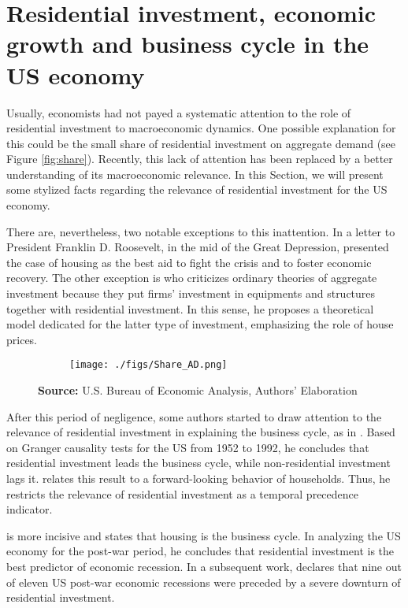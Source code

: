 \documentclass[12pt, a4paper]{article}
\begin{document}
\section{Residential investment, economic growth and business cycle in the US economy}
\label{sec:org33f19a2}
\label{sec:Stylized_Facts}
Usually, economists had not payed a systematic attention to the role of residential investment to macroeconomic dynamics.
One possible explanation for this could be the small share of residential investment on aggregate demand (see Figure \ref{fig:share}).
Recently, this lack of attention has been replaced by a better understanding of its macroeconomic relevance.
In this Section, we will present some stylized facts regarding the relevance of residential investment for the US economy.

There are, nevertheless, two notable exceptions to this inattention.
In a letter to President Franklin D. Roosevelt, in the mid of the Great Depression, \textcite[p.~436]{keynes_collected_1978} presented the case of housing as the best aid to fight the crisis and to foster economic recovery.
The other exception is \textcite{duesenberry_investment_1958} who criticizes ordinary theories of aggregate investment because they put firms’ investment in equipments and structures together with residential investment.
In this sense, he proposes a theoretical model dedicated for the latter type of investment, emphasizing the role of house prices.


\begin{figure}[H]
    \centering
	\caption{Expenditures share on aggregate demand}
	\label{fig:share}
\begin{figure}[htb]
    \texttt{[image: ./figs/Share\_AD.png]}
    \end{figure}
	\caption*{\textbf{Source:} U.S. Bureau of Economic Analysis, Authors' Elaboration}
\end{figure}
After this period of negligence, some authors started to draw attention to the relevance of residential investment in explaining the business cycle, as in \textcite{green_follow_1997}.
Based on Granger causality tests for the US from 1952 to 1992, he concludes that residential investment leads the business cycle, while non-residential investment lags it.
\textcite{green_follow_1997} relates this result to a forward-looking behavior of households.
Thus, he restricts the relevance of residential investment as a temporal precedence indicator.

\textcite{leamer_housing_2007} is more incisive and states that housing is the business cycle.
In analyzing the US economy for the post-war period, he concludes that residential investment is the best predictor of economic recession.
In a subsequent work, \textcite{leamer_housing_2015} declares that nine out of eleven US post-war economic recessions were preceded by a severe downturn of residential investment.
\end{document}
